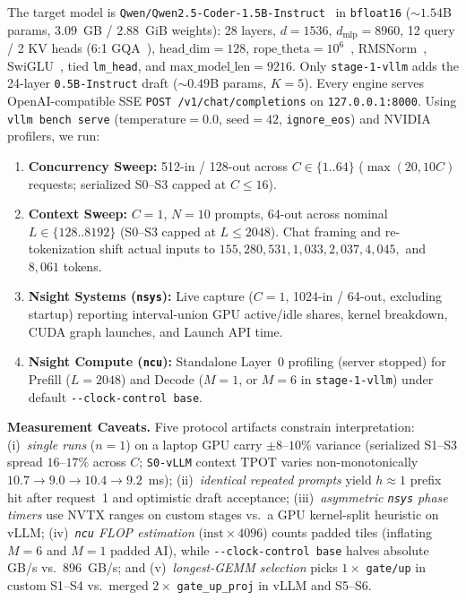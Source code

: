 \documentclass[10pt,twocolumn]{article}
\newcommand{\code}[1]{\texttt{\small #1}}
\newcommand{\stage}[1]{\texttt{\footnotesize #1}}
\begin{document}
The target model is \code{Qwen/\allowbreak Qwen2.5-Coder-1.5B-Instruct}~\cite{hui2024qwen25coder,yang2024qwen25} in \code{bfloat16} ($\sim 1.54$B params, $3.09$~GB / $2.88$~GiB weights): 28 layers, $d{=}1536$, $d_{\text{mlp}}{=}8960$, 12 query / 2 KV heads (6:1 GQA~\cite{ainslie2023gqa}), $\text{head\_dim}{=}128$, $\text{rope\_theta}{=}10^6$~\cite{su2024roformer}, RMSNorm~\cite{zhang2019rmsnorm}, SwiGLU~\cite{shazeer2020glu}, tied \code{lm\_head}, and $\text{max\_model\_len}{=}9216$. Only \stage{stage-1-vllm} adds the 24-layer \code{0.5B-Instruct} draft ($\sim 0.49$B params, $K{=}5$). Every engine serves OpenAI-compatible SSE \code{POST /v1/chat/completions} on \code{127.0.0.1:8000}. Using \code{vllm bench serve} ($\text{temperature}{=}0.0$, $\text{seed}{=}42$, \code{ignore\_eos}) and NVIDIA profilers, we run:
\begin{enumerate}\setlength{\itemsep}{1pt}\setlength{\parskip}{0pt}
  \item \textbf{Concurrency Sweep:} 512-in / 128-out across $C \in \{1..64\}$ ($\max(20, 10C)$ requests; serialized S0--S3 capped at $C \le 16$).
  \item \textbf{Context Sweep:} $C{=}1$, $N{=}10$ prompts, 64-out across nominal $L \in \{128..8192\}$ (S0--S3 capped at $L \le 2048$). Chat framing and re-tokenization shift actual inputs to $155, 280, 531, 1{,}033, 2{,}037, 4{,}045,$ and $8{,}061$ tokens.
  \item \textbf{Nsight Systems (\code{nsys}):} Live capture ($C{=}1$, 1024-in / 64-out, excluding startup) reporting interval-union GPU active/idle shares, kernel breakdown, CUDA graph launches, and Launch API time.
  \item \textbf{Nsight Compute (\code{ncu}):} Standalone Layer~0 profiling (server stopped) for Prefill ($L{=}2048$) and Decode ($M{=}1$, or $M{=}6$ in \stage{stage-1-vllm}) under default \code{-{}-clock-control base}.
\end{enumerate}

\textbf{Measurement Caveats.} Five protocol artifacts constrain interpretation: (i)~\emph{single runs} ($n{=}1$) on a laptop GPU carry $\pm 8$--$10\%$ variance (serialized S1--S3 spread $16$--$17\%$ across $C$; \stage{S0-vLLM} context TPOT varies non-monotonically $10.7 \rightarrow 9.0 \rightarrow 10.4 \rightarrow 9.2$~ms); (ii)~\emph{identical repeated prompts} yield $h \approx 1$ prefix hit after request~1 and optimistic draft acceptance; (iii)~\emph{asymmetric \code{nsys} phase timers} use NVTX ranges on custom stages vs.\ a GPU kernel-split heuristic on vLLM; (iv)~\emph{\code{ncu} FLOP estimation} ($\text{inst} \times 4096$) counts padded tiles (inflating $M{=}6$ and $M{=}1$ padded AI), while \code{-{}-clock-control base} halves absolute GB/s vs.\ $896$~GB/s; and (v)~\emph{longest-GEMM selection} picks $1\times$ \code{gate/up} in custom S1--S4 vs.\ merged $2\times$ \code{gate\_up\_proj} in vLLM and S5--S6.
\end{document}
